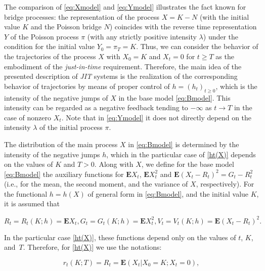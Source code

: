 	The comparison of \eqref{eq:Xmodel} and \eqref{eq:Ymodel} illustrates the fact known for bridge processes: the representation of the process $X = K - N$ (with the initial value $K$ and the Poisson bridge $N$) coincides with the reverse time representation $Y$ of the Poisson process $\pi$ (with any strictly positive intensity $\lambda$) under the condition for the initial value $Y_0 = {\pi}_T = K$. Thus, we can consider the behavior of the trajectories of the process $X$ with $X_0 = K$ and $X_t = 0$ for $t \geq T$ as the embodiment of the \emph{just-in-time} requirement. Therefore, the main idea of the presented description of \emph{JIT} systems is the realization of the corresponding behavior of trajectories by means of proper control of $h=(h_t)_{t \geq 0}$, which is the intensity of the negative jumps of $X$ in the base model \eqref{eq:Bmodel}. This intensity can be regarded as a negative feedback tending to $-\infty$ as $t \to T$ in the case of nonzero $X_t$. Note that in \eqref{eq:Ymodel} it does not directly depend on the intensity $\lambda$ of the initial process $\pi$.



	The distribution of the main process $X$ in \eqref{eq:Bmodel} is determined by the intensity of the negative jumps $h$, which in the particular case of \eqref{ht(X)} depends on the values of $K$ and $T > 0$. Along with $X$, we define for the base model \eqref{eq:Bmodel} the auxiliary functions for $\textbf{E}X_t$, $\textbf{E}X_t^2$ and $\textbf{E}(X_t - R_t)^2 = G_t - R_t^2$ (i.e., for the mean, the second moment, and the variance of $X$, respectively). For the functional $h=h(X)$ of general form in \eqref{eq:Bmodel}, and the initial value $K$, it is assumed that

\begin{equation}\label{eq:RGV}

	R_t = {R_t}(K; h) = \textbf{E}X_t, G_t = {G_t}(K; h) = \textbf{E}X_t^2, V_t = {V_t}(K; h) = \textbf{E}(X_t - R_t)^2.

\end{equation}

In the particular case \eqref{ht(X)}, these functions depend only on the values of $t$, $K$, and~$T$. Therefore, for \eqref{ht(X)} we use the notations:

\begin{equation}\label{eq:rKT}

	{r_t}(K; T) = R_t = \textbf{E}(X_t | X_0 = K; X_t = 0),

\end{equation}

